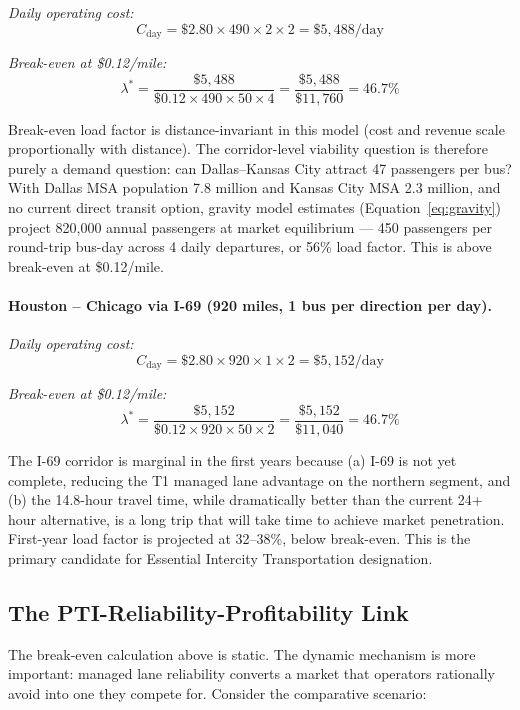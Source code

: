 \emph{Daily operating cost:}
\[
  C_{\text{day}} = \$2.80 \times 490 \times 2 \times 2 = \$5{,}488/\text{day}
\]

\emph{Break-even at \$0.12/mile:}
\[
  \lambda^* = \frac{\$5{,}488}{\$0.12 \times 490 \times 50 \times 4} = \frac{\$5{,}488}{\$11{,}760} = 46.7\%
\]

Break-even load factor is distance-invariant in this model (cost and revenue scale proportionally with distance). The corridor-level viability question is therefore purely a demand question: can Dallas--Kansas City attract 47 passengers per bus? With Dallas MSA population 7.8 million and Kansas City MSA 2.3 million, and no current direct transit option, gravity model estimates (Equation~\ref{eq:gravity}) project 820,000 annual passengers at market equilibrium --- 450 passengers per round-trip bus-day across 4 daily departures, or 56\% load factor. This is above break-even at \$0.12/mile.

\paragraph{Houston -- Chicago via I-69 (920 miles, 1 bus per direction per day).}

\emph{Daily operating cost:}
\[
  C_{\text{day}} = \$2.80 \times 920 \times 1 \times 2 = \$5{,}152/\text{day}
\]

\emph{Break-even at \$0.12/mile:}
\[
  \lambda^* = \frac{\$5{,}152}{\$0.12 \times 920 \times 50 \times 2} = \frac{\$5{,}152}{\$11{,}040} = 46.7\%
\]

The I-69 corridor is marginal in the first years because (a) I-69 is not yet complete, reducing the T1 managed lane advantage on the northern segment, and (b) the 14.8-hour travel time, while dramatically better than the current 24+ hour alternative, is a long trip that will take time to achieve market penetration. First-year load factor is projected at 32--38\%, below break-even. This is the primary candidate for Essential Intercity Transportation designation.

\subsection{The PTI-Reliability-Profitability Link}

The break-even calculation above is static. The dynamic mechanism is more important: managed lane reliability converts a market that operators rationally avoid into one they compete for. Consider the comparative scenario:

